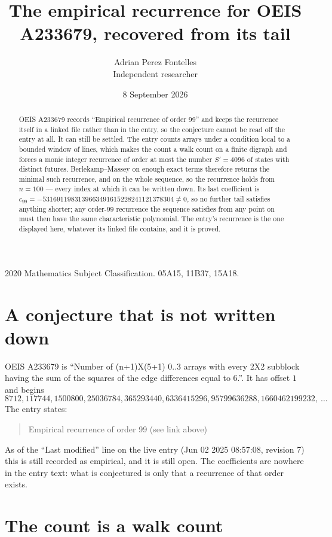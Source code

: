 \documentclass[11pt,a4paper]{article}
\title{The empirical recurrence for OEIS A233679, recovered from its tail}
\author{Adrian Perez Fontelles\\ \small Independent researcher}
\date{8 September 2026}
\theoremstyle{plain}
\theoremstyle{definition}
\begin{document}
\maketitle

\begin{abstract}
OEIS A233679 records ``Empirical recurrence of order $99$'' and keeps the recurrence itself in
a linked file rather than in the entry, so the conjecture cannot be read off the entry at all.
It can still be settled. The entry counts arrays under a condition local to a bounded window of
lines, which makes the count a walk count on a finite digraph and forces a monic integer
recurrence of order at most the number $S'=4096$ of states with distinct futures. Berlekamp--Massey on
enough exact terms therefore returns the minimal such recurrence, and on the whole sequence, so the recurrence holds from $n=100$ --- every index at which it can be written down.
Its last coefficient is $c_{99}=-5316911983139663491615228241121378304\neq0$, so no further tail satisfies anything
shorter; any order-$99$ recurrence the sequence satisfies from any point on must then have
the same characteristic polynomial. The entry's recurrence is the one displayed here, whatever
its linked file contains, and it is proved.
\end{abstract}

\noindent\small 2020 Mathematics Subject Classification. 05A15, 11B37, 15A18.\normalsize

\section{A conjecture that is not written down}

OEIS A233679 is ``Number of (n+1)X(5+1) 0..3 arrays with every 2X2 subblock having the sum of the squares of the edge differences equal to 6.''. It has offset $1$ and begins
\[
8712, 117744, 1500800, 25036784, 365293440, 6336415296, 95799636288, 1660462199232,\ \dots
\]
The entry states:
\begin{quote}
Empirical recurrence of order 99 (see link above)
\end{quote}
As of the ``Last modified'' line on the live entry (Jun 02 2025 08:57:08, revision 7)
this is still recorded as empirical, and it is still open. The coefficients are nowhere in the
entry text: what is conjectured is only that a recurrence of that order exists.

\section{The count is a walk count}
\end{document}
